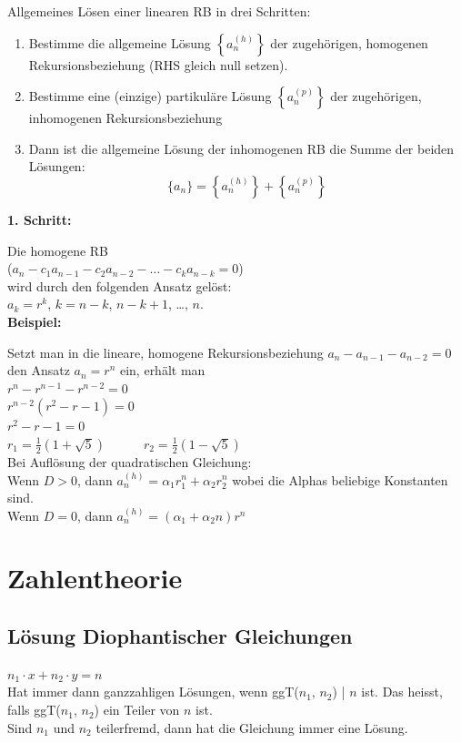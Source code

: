 \documentclass[12pt]{scrartcl}
\begin{document}
Allgemeines Lösen einer linearen RB in drei Schritten:
\begin{enumerate}
    \item Bestimme die allgemeine Lösung $\displaystyle{\left\{a_n^{(h)}\right\}}$ der zugehörigen, homogenen
    Rekursionsbeziehung (RHS gleich null setzen).
    \item Bestimme eine (einzige) partikuläre Lösung $\displaystyle{\left\{a_n^{(p)}\right\}}$ der zugehörigen, inhomogenen Rekursionsbeziehung
    \item Dann ist die allgemeine Lösung der inhomogenen RB die Summe der beiden Lösungen:
    \[\{a_n\} = \left\{a_n^{(h)}\right\} + \left\{a_n^{(p)}\right\}\]
\end{enumerate}

\textbf{1. Schritt:}

Die homogene RB\\
($a_n - c_1a_{n-1} - c_2a_{n-2} - \dots - c_ka_{n-k} = 0$)\\
wird durch den folgenden Ansatz gelöst:\\
$a_k = r^k$, $k = n-k$, $n-k + 1$, \dots, $n$.\\


\textbf{Beispiel:}

Setzt man in die lineare, homogene Rekursionsbeziehung $a_n - a_{n-1} - a_{n-2} = 0$
den Ansatz $a_n = r^n$ ein, erhält man\\

$r^n - r^{n-1} - r^{n-2} = 0$\\
$r^{n-2} (r^2 - r - 1) = 0$\\
$r^2 - r - 1 = 0$\\

$\displaystyle{r_1 = \frac{1}{2} \left(1 + \sqrt{5}\right)} \quad\quad\quad r_2 = \frac{1}{2} \left(1 - \sqrt{5}\right)$\\


Bei Auflösung der quadratischen Gleichung: \\
Wenn $D > 0$, dann $a_n^{(h)} = \alpha_1 r_1^n + \alpha_2 r_2^n$
wobei die Alphas beliebige Konstanten sind.\\

Wenn $D = 0$, dann $a_n^{(h)} = (\alpha_1 + \alpha_2 n) r^n$


\section{Zahlentheorie}
\subsection{Lösung Diophantischer Gleichungen}
$n_1 \cdot x + n_2 \cdot y = n$\\
Hat immer dann ganzzahligen Lösungen, wenn ggT($n_1$, $n_2$) | $n$ ist. Das heisst, 
falls ggT($n_1$, $n_2$) ein Teiler von $n$ ist.\\
Sind $n_1$ und $n_2$ teilerfremd, dann hat die Gleichung immer eine Lösung.\\
\end{document}
